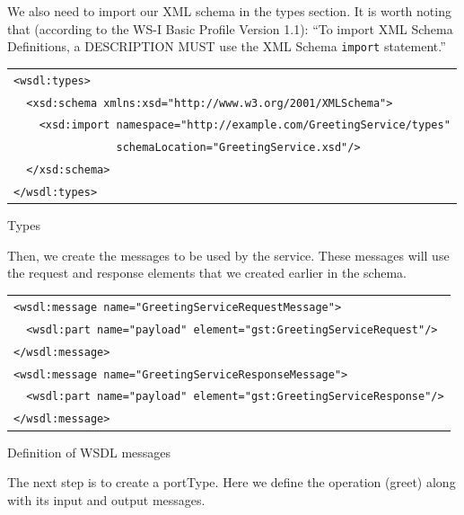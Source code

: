 \documentclass{article}
\begin{document}
\pagebreak

We also need to import our XML schema in the
types section. It is worth noting that (according to the WS-I
Basic Profile Version 1.1): ``To import XML Schema Definitions, a
DESCRIPTION MUST use the XML Schema \texttt{import} statement.''

\begin{illustration}
\begin{center}
\begin{tabular}{|l|}
\hline
\verb#<wsdl:types>#\\ 
\verb#  <xsd:schema xmlns:xsd="http://www.w3.org/2001/XMLSchema">#\\
\verb#    <xsd:import namespace="http://example.com/GreetingService/types"#\\
\verb#                schemaLocation="GreetingService.xsd"/>#\\ 
\verb#  </xsd:schema>#\\ 
\verb#</wsdl:types>#\\
\hline
\end{tabular}
\end{center}
\caption{Types}
\end{illustration}

Then, we create the messages to be used by the service. These messages
will use the request and response elements that we created earlier in the
schema.

\begin{illustration}
\begin{center}
\begin{tabular}{|l|}
\hline
\verb#<wsdl:message name="GreetingServiceRequestMessage">#\\ 
\verb#  <wsdl:part name="payload" element="gst:GreetingServiceRequest"/>#\\ 
\verb#</wsdl:message>#\\ 

\verb#<wsdl:message name="GreetingServiceResponseMessage">#\\ 
\verb#  <wsdl:part name="payload" element="gst:GreetingServiceResponse"/>#\\ 
\verb#</wsdl:message>#\\
\hline
\end{tabular}
\end{center}
\caption{Definition of WSDL messages}
\end{illustration}

The next step is to create a portType. Here we define the operation (greet)
along with its input and output messages.
\end{document}
